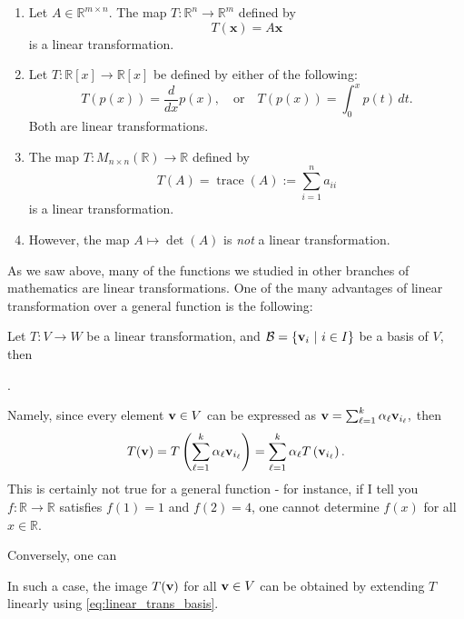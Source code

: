 \begin{example}
\hfill
\begin{enumerate}
    \item Let \( A \in \mathbb{R}^{m \times n} \). The map \( T : \mathbb{R}^n \to \mathbb{R}^m \) defined by
    \[
    T(\mathbf{x}) = A \mathbf{x}
    \]
    is a linear transformation.

    \item Let \( T : \mathbb{R}[x] \to \mathbb{R}[x] \) be defined by either of the following:
    \[
    T(p(x)) = \frac{d}{dx}p(x), \quad \text{or} \quad T(p(x)) = \int_0^x p(t) \, dt.
    \]
    Both are linear transformations.

    \item The map \( T : M_{n \times n}(\mathbb{R}) \to \mathbb{R} \) defined by
    \[
    T(A) = \operatorname{trace}(A) := \sum_{i=1}^n a_{ii}
    \]
    is a linear transformation.

    \item However, the map \( A \mapsto \det(A) \) is \emph{not} a linear transformation.
\end{enumerate}
\end{example}

As we saw above, many of the functions we studied in other branches of mathematics are linear transformations. One of the many advantages of linear transformation over a general function is the following:
\begin{remark} \label{rmk:linear_trans_basis}
Let $T:V \to W$ be a linear transformation, and $\mathcal{B} = \{{\bf v}_i\ |\ i \in I\}$ be a basis of $V$, then 
\begin{center}
.
\end{center}
Namely, since every element ${\bf v} \in V$ can be expressed as 
${\bf v} = \sum_{\ell = 1}^k \alpha_{\ell} {\bf v}_{i_{\ell}},$ then 
\begin{equation} \label{eq:linear_trans_basis}
T({\bf v}) = T\left(\sum_{\ell = 1}^k \alpha_{\ell} {\bf v}_{i_{\ell}}\right) = \sum_{\ell = 1}^k \alpha_{\ell} T\left({\bf v}_{i_{\ell}}\right).
\end{equation}
This is certainly not true for a general function - for instance, if I tell you $f: \mathbb{R} \to \mathbb{R}$ satisfies $f(1) = 1$ and $f(2) = 4$, one cannot determine $f(x)$ for all $x \in \mathbb{R}$. 

Conversely, one can
\begin{center}
\end{center}
 In such a case, the image $T({\bf v})$ for all ${\bf v} \in V$ can be obtained by extending $T$ linearly using \autoref{eq:linear_trans_basis}.
\end{remark}


